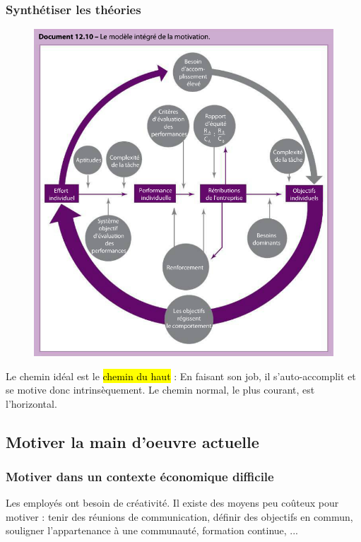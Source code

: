 \documentclass[letterpaper, 12pt]{article}
\newcommand{\alinea}{
\hspace*{0.3cm}}
\begin{document}
		\subsubsection{Synthétiser les théories}
			\begin{figure}[H]
				\centering
				\includegraphics[scale=0.75]{Images/motivation}
			\end{figure}\noindent
			\alinea Le chemin idéal est le \hl{chemin du haut} : En faisant son job, il s'auto-accomplit
				et se motive donc intrinsèquement. Le chemin normal, le plus courant, est l'horizontal.\\
	\subsection{Motiver la main d'oeuvre actuelle}
		\subsubsection{Motiver dans un contexte économique difficile}
			\alinea Les employés ont besoin de créativité. Il existe des moyens peu coûteux pour motiver : 
				tenir des réunions de communication, définir des objectifs en commun, souligner 
				l'appartenance à une communauté, formation continue, ...
\end{document}
